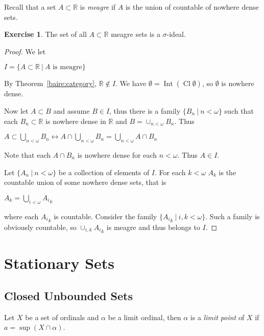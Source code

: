 \documentclass[8pt]{article}
\theoremstyle{definition}
\theoremstyle{definition}
\theoremstyle{definition}
\theoremstyle{definition}
\theoremstyle{definition}
\theoremstyle{definition}
\theoremstyle{definition}
\theoremstyle{definition}
\theoremstyle{definition}
\theoremstyle{definition}
\theoremstyle{definition}
\theoremstyle{definition}
\theoremstyle{definition}
\newtheorem{exercise}{Exercise}[section]
\theoremstyle{definition}
\theoremstyle{question}
\begin{document}
Recall that a set $A \subset \mathbb{R}$ is \emph{meagre} if $A$ is the union of countable of nowhere dense sets.

\begin{exercise}
  The set of all $A \subset \mathbb{R}$ meagre sets is a $\sigma$-ideal.
\end{exercise}

\begin{proof}
  We let 
  \begin{center}
  $I = \{ A \subset \mathbb{R} \: | \: \text{$A$ is meagre} \}$
  \end{center}

  By Theorem~\ref{baire:category}, $\mathbb{R} \notin I$. We have 
  $\emptyset = \operatorname{Int}(\operatorname{Cl}\emptyset)$, so $\emptyset$ is nowhere dense.

  Now let $A \subset B$ and assume $B \in I$, thus there is a family $\{ B_n \: | \: n < \omega \}$ such that
  each $B_n \subset \mathbb{R}$ is nowhere dense in $\mathbb{R}$ and $B = \cup_{n < \omega} B_n$.
  Thus
  \begin{center} 
  $A \subset \bigcup \limits_{n < \omega} B_n \leftrightarrow A \cap \bigcup \limits_{n < \omega} B_n = \bigcup \limits_{n < \omega} A \cap B_n$
  \end{center}

  Note that each $A \cap B_n$ is nowhere dense for each $n < \omega$. Thus $A \in I$.

  Let $\{ A_n \: | \: n < \omega \}$ be a collection of elements of $I$. For each $k < \omega$
  $A_k$ is the countable union of some nowhere dense sets, that is
  \begin{center}
    $A_k = \bigcup \limits_{i < \omega} {A_i}_{k}$
  \end{center}
  where each ${A_i}_k$ is countable.
  Consider the family $\{ {A_i}_k \: | \: i, k < \omega \}$. Such a family is obviously countable, so
  $\cup_{i, k} {A_i}_k$ is meagre and thus belongs to $I$.
\end{proof}

\section{Stationary Sets}

\subsection{Closed Unbounded Sets}

Let $X$ be a set of ordinals and $\alpha$ be a limit ordinal, then $\alpha$ is a \emph{limit point} of $X$ if
$a = \sup (X \cap \alpha)$.
\end{document}
